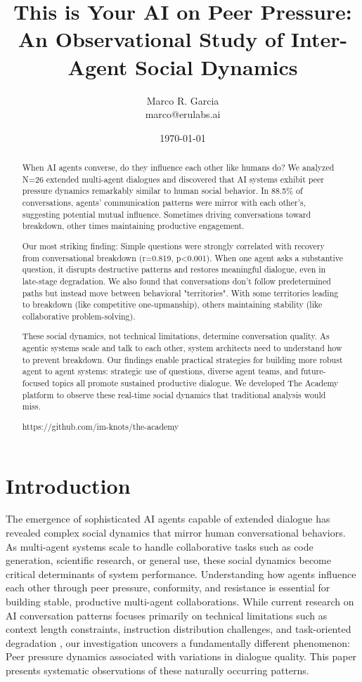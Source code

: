 \documentclass[11pt,letterpaper]{article}
\title{This is Your AI on Peer Pressure: An Observational Study of Inter-Agent Social Dynamics}
\author{
Marco R. Garcia \\
marco@erulabs.ai
}
\date{\today}
\newcommand{\theacademy}{The Academy}
\newcommand{\exponedataTotalSessionsRaw}{26}
\newcommand{\exponedataTotalSessions}{N=\exponedataTotalSessionsRaw}
\newcommand{\exponedataPeerPressurePercentage}{88.5\%}
\newcommand{\exponedataQuestionCorrelation}{0.819}
\newcommand{\exponedataQuestionPValue}{p\textless0.001}
\begin{document}
\maketitle

\begin{abstract}
When AI agents converse, do they influence each other like humans do? We analyzed \exponedataTotalSessions{} extended multi-agent dialogues and discovered that AI systems exhibit peer pressure dynamics remarkably similar to human social behavior. In \exponedataPeerPressurePercentage{} of conversations, agents’ communication patterns were mirror with each other’s, suggesting potential mutual influence. Sometimes driving conversations toward breakdown, other times maintaining productive engagement.

Our most striking finding: Simple questions were strongly correlated with recovery from conversational breakdown (r=\exponedataQuestionCorrelation{}, \exponedataQuestionPValue{}). When one agent asks a substantive question, it disrupts destructive patterns and restores meaningful dialogue, even in late-stage degradation. We also found that conversations don't follow predetermined paths but instead move between behavioral "territories". With some territories leading to breakdown (like competitive one-upmanship), others maintaining stability (like collaborative problem-solving).

These social dynamics, not technical limitations, determine conversation quality. As agentic systems scale and talk to each other, system architects need to understand how to prevent breakdown. Our findings enable practical strategies for building more robust agent to agent systems: strategic use of questions, diverse agent teams, and future-focused topics all promote sustained productive dialogue. We developed \theacademy{} platform to observe these real-time social dynamics that traditional analysis would miss.

https://github.com/im-knots/the-academy
\end{abstract}

\section{Introduction}

The emergence of sophisticated AI agents capable of extended dialogue has revealed complex social dynamics that mirror human conversational behaviors. As multi-agent systems scale to handle collaborative tasks such as code generation, scientific research, or general use, these social dynamics become critical determinants of system performance. Understanding how agents influence each other through peer pressure, conformity, and resistance is essential for building stable, productive multi-agent collaborations. While current research on AI conversation patterns focuses primarily on technical limitations such as context length constraints, instruction distribution challenges, and task-oriented degradation \citep{laban2025lost}, our investigation uncovers a fundamentally different phenomenon: Peer pressure dynamics associated with variations in dialogue quality. This paper presents systematic observations of these naturally occurring patterns.
\end{document}
